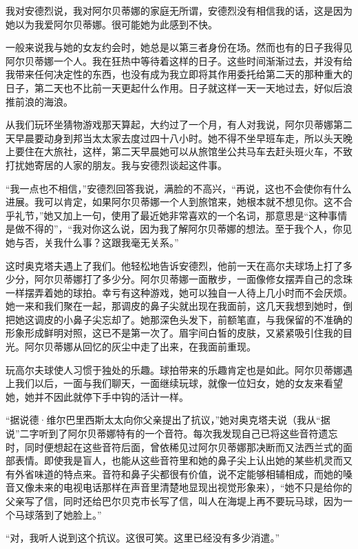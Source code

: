 \par 我对安德烈说，我对阿尔贝蒂娜的家庭无所谓，安德烈没有相信我的话，这是因为她以为我爱阿尔贝蒂娜。很可能她为此感到不快。
\par 一般来说我与她的女友约会时，她总是以第三者身份在场。然而也有的日子我得见阿尔贝蒂娜一个人。我在狂热中等待着这样的日子。这些时间渐渐过去，并没有给我带来任何决定性的东西，也没有成为我立即将其作用委托给第二天的那种重大的日子，第二天也不比前一天更起什么作用。日子就这样一天一天地过去，好似后浪推前浪的海浪。
\par 从我们玩环坐猜物游戏那天算起，大约过了一个月，有人对我说，阿尔贝蒂娜第二天早晨要动身到邦当太太家去度过四十八小时。她不得不坐早班车走，所以头天晚上要住在大旅社，这样，第二天早晨她可以从旅馆坐公共马车去赶头班火车，不致打扰她寄居的人家的朋友。我与安德烈谈起这件事。
\par “我一点也不相信，”安德烈回答我说，满脸的不高兴，“再说，这也不会使你有什么进展。我可以肯定，如果阿尔贝蒂娜一个人到旅馆来，她根本就不想见你。这不合乎礼节，”她又加上一句，使用了最近她非常喜欢的一个名词，那意思是“这种事情是做不得的”，“我对你这么说，因为我了解阿尔贝蒂娜的想法。至于我个人，你见她与否，关我什么事？这跟我毫无关系。”
\par 这时奥克塔夫遇上了我们。他轻松地告诉安德烈，他前一天在高尔夫球场上打了多少分，阿尔贝蒂娜打了多少分。阿尔贝蒂娜一面散步，一面像修女摆弄自己的念珠一样摆弄着她的球拍。幸亏有这种游戏，她可以独自一人待上几小时而不会厌烦。她一来和我们聚在一起，那调皮的鼻子尖就出现在我面前，这几天我想到她时，倒把她这调皮的小鼻子尖忘却了。她那深色头发下，前额笔直，与我保留的不准确的形象形成鲜明对照，这已不是第一次了。眉宇间白皙的皮肤，又紧紧吸引住我的目光。阿尔贝蒂娜从回忆的灰尘中走了出来，在我面前重现。
\par 玩高尔夫球使人习惯于独处的乐趣。球拍带来的乐趣肯定也是如此。阿尔贝蒂娜遇上我们以后，一面与我们聊天，一面继续玩球，就像一位妇女，她的女友来看望她，她并不因此就停下手中钩的活计一样。
\par “据说德·维尔巴里西斯太太向你父亲提出了抗议，”她对奥克塔夫说（我从“据说”二字听到了阿尔贝蒂娜特有的一个音符。每次我发现自己已将这些音符遗忘时，同时便想起在这些音符后面，曾依稀见过阿尔贝蒂娜那决断而又法西兰式的面部表情。即使我是盲人，也能从这些音符里和她的鼻子尖上认出她的某些机灵而又有外省味道的特点来。音符和鼻子尖都很有价值，说不定能够相辅相成，而她的嗓音又像未来的电视电话那样在声音里清楚地显现出视觉形象来），“她不只是给你的父亲写了信，同时还给巴尔贝克市长写了信，叫人在海堤上再不要玩马球，因为一个马球落到了她脸上。”
\par “对，我听人说到这个抗议。这很可笑。这里已经没有多少消遣。”
